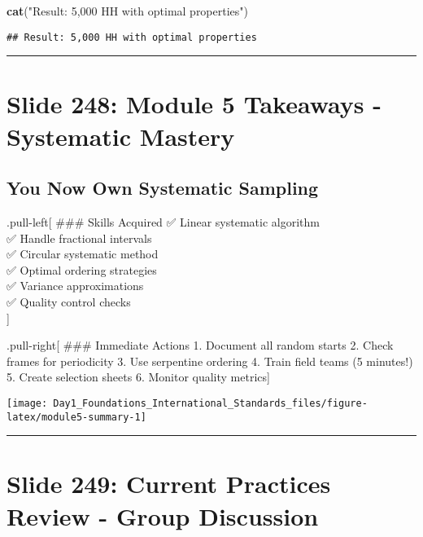 \documentclass[
]{article}
\newenvironment{Shaded}{\begin{snugshade}}{\end{snugshade}}
\newcommand{\FunctionTok}[1]{\textcolor[rgb]{0.13,0.29,0.53}{\textbf{#1}}}
\newcommand{\NormalTok}[1]{#1}
\newcommand{\StringTok}[1]{\textcolor[rgb]{0.31,0.60,0.02}{#1}}
\begin{document}
\begin{Shaded}
\begin{Highlighting}[]
\FunctionTok{cat}\NormalTok{(}\StringTok{"Result: 5,000 HH with optimal properties"}\NormalTok{)}
\end{Highlighting}
\end{Shaded}

\begin{verbatim}
## Result: 5,000 HH with optimal properties
\end{verbatim}

\begin{center}\rule{0.5\linewidth}{0.5pt}\end{center}

\section{Slide 248: Module 5 Takeaways - Systematic
Mastery}\label{slide-248-module-5-takeaways---systematic-mastery}

\subsection{You Now Own Systematic
Sampling}\label{you-now-own-systematic-sampling}

.pull-left{[} \#\#\# Skills Acquired ✅ Linear systematic algorithm\\
✅ Handle fractional intervals\\
✅ Circular systematic method\\
✅ Optimal ordering strategies\\
✅ Variance approximations\\
✅ Quality control checks\\
{]}

.pull-right{[} \#\#\# Immediate Actions 1. Document all random starts 2.
Check frames for periodicity 3. Use serpentine ordering 4. Train field
teams (5 minutes!) 5. Create selection sheets 6. Monitor quality
metrics{]}

\texttt{[image: Day1\_Foundations\_International\_Standards\_files/figure-latex/module5-summary-1]}

\begin{center}\rule{0.5\linewidth}{0.5pt}\end{center}

\section{Slide 249: Current Practices Review - Group
Discussion}\label{slide-249-current-practices-review---group-discussion}
\end{document}
